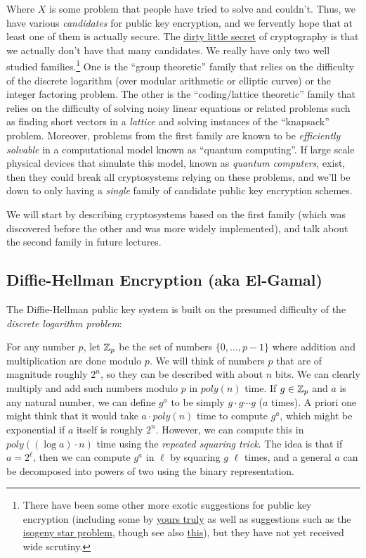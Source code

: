 Where \(X\) is some problem that people have tried to solve and
couldn't. Thus, we have various \emph{candidates} for public key
encryption, and we fervently hope that at least one of them is actually
secure. The \href{https://eprint.iacr.org/2017/365.pdf}{dirty little
secret} of cryptography is that we actually don't have that many
candidates. We really have only two well studied families.\footnote{There
  have been some other more exotic suggestions for public key encryption
  (including some by
  \href{http://www.eng.tau.ac.il/~bennyap/pubs/ncpkcFull1.pdf}{yours
  truly} as well as suggestions such as the
  \href{http://eprint.iacr.org/2006/291}{isogeny star problem}, though
  see also \href{http://arxiv.org/pdf/1012.4019.pdf}{this}), but they
  have not yet received wide scrutiny.} One is the ``group theoretic''
family that relies on the difficulty of the discrete logarithm (over
modular arithmetic or elliptic curves) or the integer factoring problem.
The other is the ``coding/lattice theoretic'' family that relies on the
difficulty of solving noisy linear equations or related problems such as
finding short vectors in a \emph{lattice} and solving instances of the
``knapsack'' problem. Moreover, problems from the first family are known
to be \emph{efficiently solvable} in a computational model known as
``quantum computing''. If large scale physical devices that simulate
this model, known as \emph{quantum computers}, exist, then they could
break all cryptosystems relying on these problems, and we'll be down to
only having a \emph{single} family of candidate public key encryption
schemes.

We will start by describing cryptosystems based on the first family
(which was discovered before the other and was more widely implemented),
and talk about the second family in future lectures.

\subsection{Diffie-Hellman Encryption (aka
El-Gamal)}\label{Diffie-Hellman-Encryption-aka-}

The Diffie-Hellman public key system is built on the presumed difficulty
of the \emph{discrete logarithm problem}:

For any number \(p\), let \({\mathbb{Z}}_p\) be the set of numbers
\(\{0,\ldots,p-1\}\) where addition and multiplication are done modulo
\(p\). We will think of numbers \(p\) that are of magnitude roughly
\(2^n\), so they can be described with about \(n\) bits. We can clearly
multiply and add such numbers modulo \(p\) in \(poly(n)\) time. If
\(g\in {\mathbb{Z}}_p\) and \(a\) is any natural number, we can define \(g^a\) to
be simply \(g\cdot g \cdots g\) (\(a\) times). A priori one might think
that it would take \(a\cdot poly(n)\) time to compute \(g^a\), which
might be exponential if \(a\) itself is roughly \(2^n\). However, we can
compute this in \(poly((\log a) \cdot n)\) time using the \emph{repeated
squaring trick}. The idea is that if \(a=2^{\ell}\), then we can compute
\(g^a\) in \(\ell\) by squaring \(g\) \(\ell\) times, and a general
\(a\) can be decomposed into powers of two using the binary
representation.

